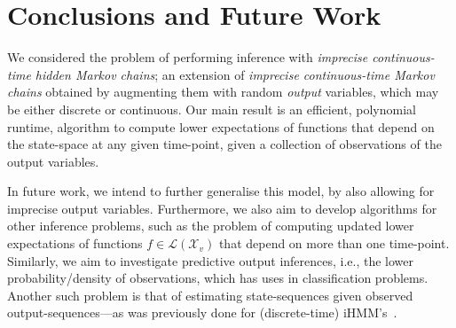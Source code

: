 \documentclass[twoside,11pt]{article}
\newcommand{\states}{\mathcal{X}}
\newcommand{\gambles}{\mathcal{L}}
\begin{document}
\section{Conclusions and Future Work}\label{sec:conclusions}

We considered the problem of performing inference with \emph{imprecise continuous-time hidden Markov chains}; an extension of \emph{imprecise continuous-time Markov chains} obtained by augmenting them with random \emph{output} variables, which may be either discrete or continuous.
Our main result is an efficient, polynomial runtime, algorithm to compute lower expectations of functions that depend on the state-space at any given time-point, given a collection of observations of the output variables. %

In future work, we intend to further generalise this model, by also allowing for imprecise output variables. Furthermore, we also aim to develop algorithms for other inference problems,
such as the problem of computing updated lower expectations of functions $f\in\gambles(\states_v)$ that depend on more than one time-point. Similarly, we aim to investigate predictive output inferences, i.e., the lower probability/density of observations, which has uses in classification problems. Another such problem is that of estimating state-sequences given observed output-sequences---as was previously done for (discrete-time) iHMM's~\citep{DeBock:2014ts}. %
\vspace{-9pt}

\appendix
\end{document}
